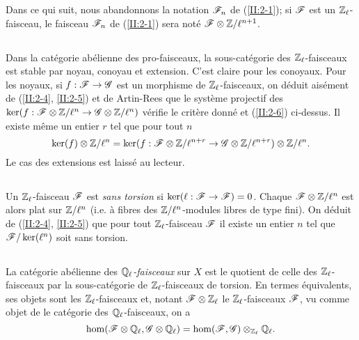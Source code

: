 \documentclass[oneside]{book}
\begin{document}
Dans ce qui suit, nous abandonnons la notation $\mathscr{F}_n$ de (\ref{II:2-1}); si 
$\mathscr{F}$ est un $\mathbb{Z}_\ell$-faisceau, le faisceau $\mathscr{F}_n$ de (\ref{II:2-1}) sera 
noté $\mathscr{F}\otimes\mathbb{Z}/\ell^{n+1}$. 





\subsection{}\label{II:2-7}

Dans la catégorie abélienne des pro-faisceaux, la sous-catégorie des 
$\mathbb{Z}_\ell$-faisceaux est stable par noyau, conoyau et extension. C'est claire 
pour les conoyaux. Pour les noyaux, si $f:\mathscr{F}\to\mathscr{G}$ est un morphisme de 
$\mathbb{Z}_\ell$-faisceaux, on déduit aisément de (\ref{II:2-4}, \ref{II:2-5}) 
et de Artin-Rees que le système projectif des 
$\ker(f:\mathscr{F}\otimes\mathbb{Z}/\ell^n\to\mathscr{G}\otimes\mathbb{Z}/\ell^n)$ vérifie le critère 
donné et (\ref{II:2-6}) ci-dessus. Il existe même un entier $r$ tel que pour 
tout $n$ 
\[
  \ker(f)\otimes\mathbb{Z}/\ell^n = \ker(f:\mathscr{F}\otimes\mathbb{Z}/\ell^{n+r}\to\mathscr{G}\otimes\mathbb{Z}/\ell^{n+r})\otimes\mathbb{Z}/\ell^n \text{.}
\]
Le cas des extensions est laissé au lecteur. 





\subsection{}\label{II:2-8}

Un $\mathbb{Z}_\ell$-faisceau $\mathscr{F}$ est \emph{sans torsion} si 
$\ker(\ell:\mathscr{F}\to\mathscr{F}) = 0$. Chaque $\mathscr{F}\otimes\mathbb{Z}/\ell^n$ est alors plat sur 
$\mathbb{Z}/\ell^n$ (i.e. à fibres des $\mathbb{Z}/\ell^n$-modules libres de type fini). On 
déduit de (\ref{II:2-4}, \ref{II:2-5}) que pour tout $\mathbb{Z}_\ell$-faisceau 
$\mathscr{F}$ il existe un entier $n$ tel que $\mathscr{F}/\ker(\ell^n)$ soit sans torsion. 





\subsection{}\label{II:2-9}

La catégorie abélienne des \emph{$\mathbb{Q}_\ell$-faisceaux} sur $X$ est le 
quotient de celle des $\mathbb{Z}_\ell$-faisceaux par la sous-catégorie de 
$\mathbb{Z}_\ell$-faisceaux de torsion. En termes équivalents, ses objets sont les 
$\mathbb{Z}_\ell$-faisceaux et, notant $\mathscr{F}\otimes\mathbb{Z}_\ell$ le $\mathbb{Z}_\ell$-faisceaux 
$\mathscr{F}$, vu comme objet de le catégorie des $\mathbb{Q}_\ell$-faisceaux, on a 
\[
  \hom(\mathscr{F}\otimes\mathbb{Q}_\ell,\mathscr{G}\otimes\mathbb{Q}_\ell) = \hom(\mathscr{F},\mathscr{G})\otimes_{\mathbb{Z}_\ell}\mathbb{Q}_\ell \text{.}
\]
\end{document}
